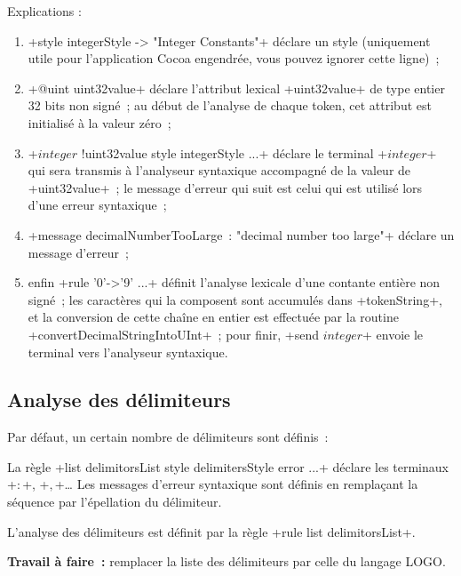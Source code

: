 Explications :
\begin{enumerate}
  \item \ggst+style integerStyle -> "Integer Constants"+ déclare un style (uniquement utile pour l’application Cocoa engendrée, vous pouvez ignorer cette ligne)~;
  \item \ggst+@uint uint32value+ déclare l’attribut lexical \ggst+uint32value+ de type entier 32 bits non signé~; au début de l’analyse de chaque token, cet attribut est initialisé à la valeur zéro~;
  \item \ggst+$integer$ !uint32value style integerStyle ...+ déclare le terminal \ggst+$integer$+ qui sera transmis à l’analyseur syntaxique accompagné de la valeur de \ggst+uint32value+~;  le message d’erreur qui suit est celui qui est utilisé lors d’une erreur syntaxique~;
  \item \ggst+message decimalNumberTooLarge~: "decimal number too large"+ déclare un message d’erreur~;
  \item enfin \ggst+rule '0'->'9' ...+ définit l’analyse lexicale d’une contante entière non signé~; les caractères qui la composent sont accumulés dans \ggst+tokenString+, et la conversion de cette chaîne en entier est effectuée par la routine \ggst+convertDecimalStringIntoUInt+~; pour finir, \ggst+send $integer$+ envoie le terminal vers l’analyseur syntaxique.
\end{enumerate}

\subsection{Analyse des délimiteurs}
Par défaut, un certain nombre de délimiteurs sont définis~:


La règle \ggst+list delimitorsList style delimitersStyle error ...+ déclare les terminaux \ggst+$:$+, \ggst+$,$+… Les messages d'erreur syntaxique sont définis en remplaçant la séquence  par l’épellation du délimiteur.

L'analyse des délimiteurs est définit par la règle \ggst+rule list delimitorsList+.

\textbf{Travail à faire~:} remplacer la liste des délimiteurs par celle du langage LOGO.

